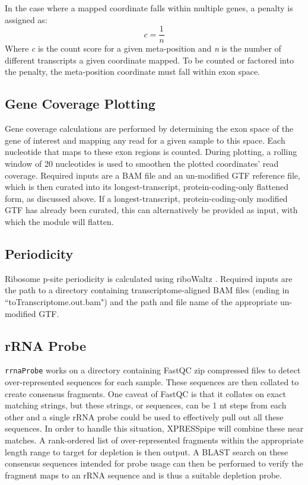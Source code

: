 \documentclass[10pt, oneside]{article}
\begin{document}
In the case where a mapped coordinate falls within multiple genes, a penalty is assigned as:
\begin{equation}
  \textit{c} = \frac{1}{\textit{n}}
\end{equation}
Where \textit{c} is the count score for a given meta-position and \textit{n} is the number of different transcripts a given coordinate mapped. To be counted or factored into the penalty, the meta-position coordinate must fall within exon space.

\subsection{Gene Coverage Plotting}
Gene coverage calculations are performed by determining the exon space of the gene of interest and mapping any read for a given sample to this space. Each nucleotide that maps to these exon regions is counted. During plotting, a rolling window of 20 nucleotides is used to smoothen the plotted coordinates' read coverage. Required inputs are a BAM file and an un-modified GTF reference file, which is then curated into its longest-transcript, protein-coding-only flattened form, as discussed above. If a longest-transcript, protein-coding-only modified GTF has already been curated, this can alternatively be provided as input, with which the module will flatten.

\subsection{Periodicity}
Ribosome p-site periodicity is calculated using riboWaltz \cite{ribowaltz}. Required inputs are the path to a directory containing transcriptome-aligned BAM files (ending in ``toTranscriptome.out.bam") and the path and file name of the appropriate un-modified GTF.

\subsection{rRNA Probe}
\texttt{rrnaProbe} works on a directory containing FastQC \cite{fastqc} zip compressed files to detect over-represented sequences for each sample. These sequences are then collated to create consensus fragments. One caveat of FastQC is that it collates on exact matching strings, but these strings, or sequences, can be 1 nt steps from each other and a single rRNA probe could be used to effectively pull out all these sequences. In order to handle this situation, XPRESSpipe will combine these near matches. A rank-ordered list of over-represented fragments within the appropriate length range to target for depletion is then output. A BLAST \cite{blast} search on these consensus sequences intended for probe usage can then be performed to verify the fragment maps to an rRNA sequence and is thus a suitable depletion probe.
\end{document}

